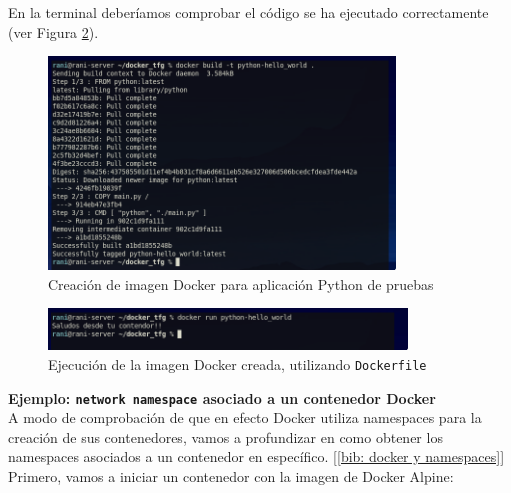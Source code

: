 \documentclass[12pt]{article}
\begin{document}
\begin{enumerate}
	\noindent En la terminal deberíamos comprobar el código se ha ejecutado correctamente (ver Figura \ref{img: dockerfile python run}).
	
	\begin{figure}[h]
		\begin{center}
			\includegraphics[width=0.82\textwidth]{img/dockerfile_build.png}
			\caption{Creación de imagen Docker para aplicación Python de pruebas}
			\label{img: dockerfile python build}
		\end{center}
	\end{figure}

	\begin{figure}[h]
		\begin{center}
			\includegraphics[width=0.85\textwidth]{img/dockerfile_run.png}
			\caption{Ejecución de la imagen Docker creada, utilizando \texttt{Dockerfile}}
			\label{img: dockerfile python run}
		\end{center}
	\end{figure}
	
	\end{enumerate}
	
	\pagebreak
	
	\noindent \textbf{\large Ejemplo: \texttt{network namespace} asociado a un contenedor Docker}\\
	
	\noindent A modo de comprobación de que en efecto Docker utiliza namespaces para la creación de sus contenedores, vamos a profundizar en como obtener los namespaces asociados a un contenedor en específico. [\ref{bib: docker y namespaces}] \\
	
	\noindent Primero, vamos a iniciar un contenedor con la imagen de Docker Alpine:
	
\end{document}
